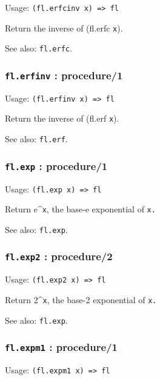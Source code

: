 \documentclass[
]{article}
\newcommand{\passthrough}[1]{#1}
\begin{document}
Usage: \passthrough{\lstinline!(fl.erfcinv x) => fl!}

Return the inverse of (fl.erfc \passthrough{\lstinline!x!}).

See also: \passthrough{\lstinline!fl.erfc!}.

\hypertarget{fl.erfinv-procedure1}{%
\subsubsection{\texorpdfstring{\texttt{fl.erfinv} :
procedure/1}{fl.erfinv : procedure/1}}\label{fl.erfinv-procedure1}}

Usage: \passthrough{\lstinline!(fl.erfinv x) => fl!}

Return the inverse of (fl.erf \passthrough{\lstinline!x!}).

See also: \passthrough{\lstinline!fl.erf!}.

\hypertarget{fl.exp-procedure1}{%
\subsubsection{\texorpdfstring{\texttt{fl.exp} :
procedure/1}{fl.exp : procedure/1}}\label{fl.exp-procedure1}}

Usage: \passthrough{\lstinline!(fl.exp x) => fl!}

Return e\^{}\passthrough{\lstinline!x!}, the base-e exponential of
\passthrough{\lstinline!x.!}

See also: \passthrough{\lstinline!fl.exp!}.

\hypertarget{fl.exp2-procedure2}{%
\subsubsection{\texorpdfstring{\texttt{fl.exp2} :
procedure/2}{fl.exp2 : procedure/2}}\label{fl.exp2-procedure2}}

Usage: \passthrough{\lstinline!(fl.exp2 x) => fl!}

Return 2\^{}\passthrough{\lstinline!x!}, the base-2 exponential of
\passthrough{\lstinline!x.!}

See also: \passthrough{\lstinline!fl.exp!}.

\hypertarget{fl.expm1-procedure1}{%
\subsubsection{\texorpdfstring{\texttt{fl.expm1} :
procedure/1}{fl.expm1 : procedure/1}}\label{fl.expm1-procedure1}}

Usage: \passthrough{\lstinline!(fl.expm1 x) => fl!}
\end{document}
